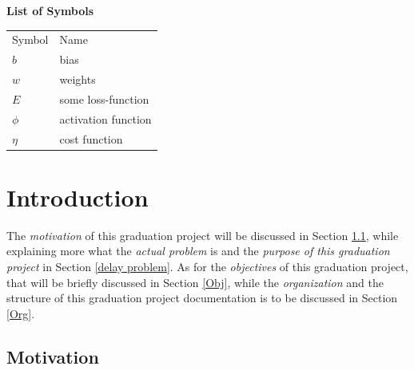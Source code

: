 \documentclass[12pt]{extarticle}
\begin{document}
	\newpage
	\LARGE{\textbf{List of Symbols}}\\ \vspace{1cm}
	\large{}
	\begin{center}
		\begin{tabular}{l l}
			{Symbol} & {Name} \\
			$b$ & bias\\
			$w$ & weights\\
			$E$ & some loss-function\\
			$\phi$ & activation function\\
			$\eta$ & cost function
		\end{tabular}
	\end{center}
	
	
	\newpage
	\large{}
	\section{Introduction}
	The \emph{motivation} of this graduation project will be discussed in Section \ref{Motiv}, while explaining more what the \emph{actual problem} is and the \emph{purpose of this graduation project} in Section \ref{delay problem}. As for the \emph{objectives} of this graduation project, that will be briefly discussed in Section \ref{Obj}, while the \emph{organization} and the structure of this graduation project documentation is to be discussed in Section \ref{Org}.
	\subsection{Motivation}\label{Motiv}
	
\end{document}

